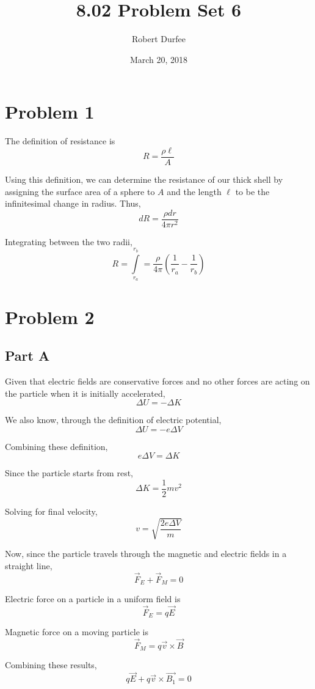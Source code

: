 \documentclass{article}
\title{ 8.02 Problem Set 6 }
\author{ Robert Durfee }
\date{ March 20, 2018 }
\begin{document}
\maketitle

\section*{Problem 1}

The definition of resistance is
$$ R = \frac{ \rho \ell }{ A } $$

Using this definition, we can determine the resistance of our thick shell by
assigning the surface area of a sphere to $A$ and the length $\ell$ to be the
infinitesimal change in radius. Thus,
$$ dR = \frac{ \rho dr }{ 4 \pi r^{2} } $$

Integrating between the two radii,
$$ R = \int\limits_{r_{a}}^{r_{b}} = \frac{ \rho }{ 4 \pi } \left( \frac{ 1 }{
r_{a} } - \frac{ 1 }{ r_{b} } \right) $$

\section*{Problem 2}

\subsection*{Part A}

Given that electric fields are conservative forces and no other forces are
acting on the particle when it is initially accelerated,
$$ \Delta U = -\Delta K $$

We also know, through the definition of electric potential,
$$ \Delta U = - e \Delta V $$

Combining these definition,
$$ e \Delta V = \Delta K $$

Since the particle starts from rest,
$$ \Delta K = \frac{ 1 }{ 2 } m v^2 $$

Solving for final velocity,
$$ v = \sqrt{\frac{ 2 e \Delta V}{ m }} $$

Now, since the particle travels through the magnetic and electric fields in a
straight line,
$$ \vec{F}_{E} + \vec{F}_{M} = 0 $$

Electric force on a particle in a uniform field is
$$ \vec{F}_{E} = q \vec{E} $$

Magnetic force on a moving particle is
$$ \vec{F}_{M} = q \vec{v} \times \vec{B} $$

Combining these results,
$$ q \vec{E} + q \vec{v} \times \vec{B_{1}} = 0 $$
\end{document}
